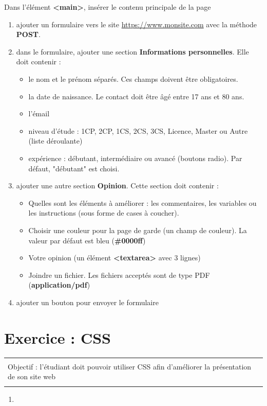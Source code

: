 \documentclass[11pt, a4paper]{article}
\begin{document}
Dans l'élément \textbf{<main>}, insérer le contenu principale de la page  
\begin{enumerate}
	\item ajouter un formulaire vers le site \url{https://www.monsite.com} avec la méthode \textbf{POST}. 
	\item dans le formulaire, ajouter une section \textbf{Informations personnelles}. 
	Elle doit contenir : 
	\begin{itemize}
		\item le nom et le prénom séparés. Ces champs doivent être obligatoires. 
		\item la date de naissance. Le contact doit être âgé entre 17 ans et 80 ans.
		\item l'émail 
		\item niveau d'étude : 1CP, 2CP, 1CS, 2CS, 3CS, Licence, Master ou Autre (liste déroulante)
		\item expérience : débutant, intermédiaire ou avancé (boutons radio). Par défaut, "débutant" est choisi.
	\end{itemize}
	\item ajouter une autre section \textbf{Opinion}. Cette section doit contenir : 
	\begin{itemize}
		\item Quelles sont les éléments à améliorer : les commentaires, les variables ou les instructions (sous forme de cases à coucher).
		\item Choisir une couleur pour la page de garde (un champ de couleur). La valeur par défaut est bleu (\textbf{\#0000ff})
		\item Votre opinion (un élément \textbf{<textarea>} avec 3 lignes)
		\item Joindre un fichier. Les fichiers acceptés sont de type PDF (\textbf{application/pdf})
	\end{itemize}
	\item ajouter un bouton pour envoyer le formulaire
\end{enumerate}




\section*{Exercice : CSS}

\vspace{-12pt}
\begin{tabular}{|p{\textwidth}|}
	\hline\\
	Objectif : l'étudiant doit pouvoir utiliser CSS afin d'améliorer la présentation de son site web \\\\
	\hline
\end{tabular}

\begin{enumerate}
	\item 
\end{enumerate}
\end{document}
